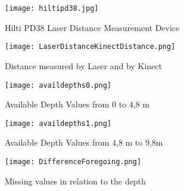 \begin{figure}[htp]
\begin{center}
  \texttt{[image: hiltipd38.jpg]}
  \caption{Hilti PD38 Laser Distance Measurement Device}
  \label{figure:hilti}
\end{center}
\end{figure}
\begin{figure}[htp]
\begin{center}
  \texttt{[image: LaserDistanceKinectDistance.png]}
  \caption{Distance measured by Laser and by Kinect}
  \label{figure:LaserKinect}
\end{center}
\end{figure}
\begin{figure}[htp]
\begin{center}
  \texttt{[image: availdepths0.png]}
  \caption{Available Depth Values from 0 to 4,8 m}
  \label{figure:depths1}
\end{center}
\end{figure}
\begin{figure}[htp]
\begin{center}
  \texttt{[image: availdepths1.png]}
  \caption{Available Depth Values from 4,8 m to 9,8m}
  \label{figure:depths2}
\end{center}
\end{figure}
\begin{figure}[htp]
\begin{center}
  \texttt{[image: DifferenceForegoing.png]}
  \caption{Missing values in relation to the depth}
  \label{figure:DepthValueDiff}
\end{center}
\end{figure}
